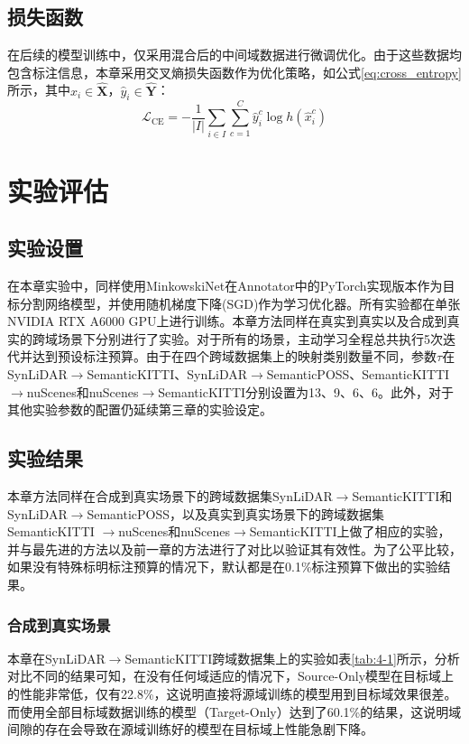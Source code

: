     \subsection{损失函数}
    在后续的模型训练中，仅采用混合后的中间域数据进行微调优化。由于这些数据均包含标注信息，本章采用交叉熵损失函数作为优化策略，如公式\eqref{eq:cross_entropy}所示，其中$\hat{x}_{i} \in \hat{\mathbf{X}}$，$\hat{y}_{i} \in \hat{\mathbf{Y}}$：
    \begin{equation}
        \label{eq:cross_entropy}
        \mathcal{L}_{\text{CE}} = - \frac{1}{|I|} \sum_{i \in I} \sum_{c=1}^{C} \hat{y}_{i}^{c} \log h(\hat{x}_{i}^{c})
    \end{equation}

    \section{实验评估}
    \subsection{实验设置}
    在本章实验中，同样使用MinkowskiNet在Annotator中的PyTorch实现版本作为目标分割网络模型，并使用随机梯度下降(SGD)作为学习优化器。所有实验都在单张NVIDIA RTX A6000 GPU上进行训练。本章方法同样在真实到真实以及合成到真实的跨域场景下分别进行了实验。对于所有的场景，主动学习全程总共执行5次迭代并达到预设标注预算。由于在四个跨域数据集上的映射类别数量不同，参数$\tau$在SynLiDAR$\to$SemanticKITTI、SynLiDAR$\to$SemanticPOSS、SemanticKITTI$\to$nuScenes和nuScenes$\to$SemanticKITTI分别设置为13、9、6、6。此外，对于其他实验参数的配置仍延续第三章的实验设定。
    \subsection{实验结果}
    本章方法同样在合成到真实场景下的跨域数据集SynLiDAR$\to$SemanticKITTI和SynLiDAR$\to$SemanticPOSS，以及真实到真实场景下的跨域数据集SemanticKITTI
    $\to$nuScenes和nuScenes$\to$SemanticKITTI上做了相应的实验，并与最先进的方法以及前一章的方法进行了对比以验证其有效性。为了公平比较，如果没有特殊标明标注预算的情况下，默认都是在0.1\%标注预算下做出的实验结果。
    \subsubsection{合成到真实场景}
    
    本章在SynLiDAR$\to$SemanticKITTI跨域数据集上的实验如表\ref{tab:4-1}所示，分析对比不同的结果可知，在没有任何域适应的情况下，Source-Only模型在目标域上的性能非常低，仅有22.8\%，这说明直接将源域训练的模型用到目标域效果很差。而使用全部目标域数据训练的模型（Target-Only）达到了60.1\%的结果，这说明域间隙的存在会导致在源域训练好的模型在目标域上性能急剧下降。

